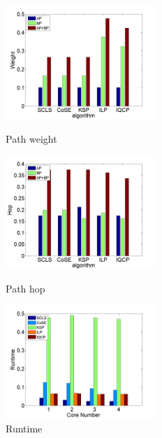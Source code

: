 \begin{figure}[tp]
\centering
\begin{minipage}[t]{0.3\linewidth}
\centering
\includegraphics[width=2.25in]{franz/weight}
\caption{Path weight}
\label{fig:normalization weitgh sum}
\end{minipage}
\hfill
\begin{minipage}[t]{0.3\linewidth}
\centering
\includegraphics[width=2.25in]{franz/hop}
\caption{Path hop}
\label{fig:normalization hop}
\end{minipage}
\hfill
\begin{minipage}[t]{0.3\linewidth}
\centering
\includegraphics[width=2.25in]{franz/runtime}
\caption{Runtime}
\label{fig:normalization runtime}
\end{minipage}
\end{figure}


